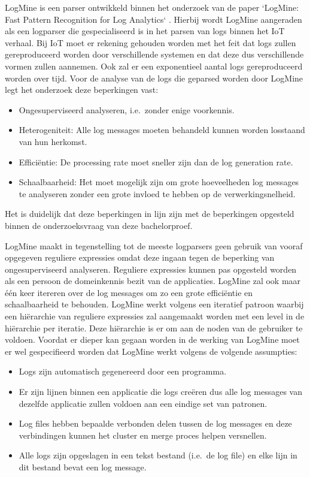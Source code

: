 LogMine is een parser ontwikkeld binnen het onderzoek van de paper `LogMine: Fast Pattern Recognition for Log Analytics` \autocite{hamooni2016logmine}. Hierbij wordt LogMine aangeraden als een logparser die gespecialiseerd is in het parsen van logs binnen het IoT verhaal. Bij IoT moet er rekening gehouden worden met het feit dat logs zullen gereproduceerd worden door verschillende systemen en dat deze dus verschillende vormen zullen aannemen. Ook zal er een exponentieel aantal logs gereproduceerd worden over tijd. Voor de analyse van de logs die geparsed worden door LogMine legt het onderzoek deze beperkingen vast: 
\begin{itemize}
    \item Ongesuperviseerd analyseren, i.e.\ zonder enige voorkennis.
    \item Heterogeniteit: Alle log messages moeten behandeld kunnen worden losstaand van hun herkomst.
    \item Efficiëntie: De processing rate moet sneller zijn dan de log generation rate.
    \item Schaalbaarheid: Het moet mogelijk zijn om grote hoeveelheden log messages te analyseren zonder een grote invloed te hebben op de verwerkingsnelheid.
\end{itemize}
Het is duidelijk dat deze beperkingen in lijn zijn met de beperkingen opgesteld binnen de onderzoeksvraag van deze bachelorproef.

LogMine maakt in tegenstelling tot de meeste logparsers geen gebruik van vooraf opgegeven reguliere expressies omdat deze ingaan tegen de beperking van ongesuperviseerd analyseren. Reguliere expressies kunnen pas opgesteld worden als een persoon de domeinkennis bezit van de applicaties. LogMine zal ook maar één keer itereren over de log messages om zo een grote efficiëntie en schaalbaarheid te behouden. LogMine werkt volgens een iteratief patroon waarbij een hiërarchie van reguliere expressies zal aangemaakt worden met een level in de hiërarchie per iteratie. Deze hiërarchie is er om aan de noden van de gebruiker te voldoen. Voordat er dieper kan gegaan worden in de werking van LogMine moet er wel gespecifieerd worden dat LogMine werkt volgens de volgende assumpties:
\begin{itemize}
    \item Logs zijn automatisch gegenereerd door een programma.
    \item Er zijn lijnen binnen een applicatie die logs creëren dus alle log messages van dezelfde applicatie zullen voldoen aan een eindige set van patronen.
    \item Log files hebben bepaalde verbonden delen tussen de log messages en deze verbindingen kunnen het cluster en merge proces helpen versnellen.
    \item Alle logs zijn opgeslagen in een tekst bestand (i.e.\ de log file) en elke lijn in dit bestand bevat een log message.
\end{itemize}

